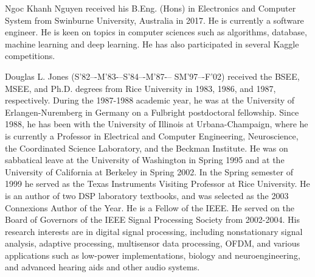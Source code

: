 \documentclass[journal]{IEEEtran}
\begin{document}
\begin{IEEEbiography}{Ngoc Khanh Nguyen} received his B.Eng. (Hons) in Electronics and Computer System from Swinburne University, Australia in 2017. He is currently a software engineer. He is keen on topics in computer sciences such as algorithms, database, machine learning and deep learning. He has also participated in several Kaggle competitions.
\end{IEEEbiography}


\begin{IEEEbiography}{Douglas L. Jones} (S’82–-M’83-–S’84–-M’87-–
SM’97–-F’02) received the BSEE, MSEE, and Ph.D. degrees from Rice University in 1983, 1986, and 1987, respectively. During the 1987-1988 academic year, he was at the University of Erlangen-Nuremberg in Germany on a Fulbright postdoctoral fellowship. Since 1988, he has been with the University of Illinois at Urbana-Champaign, where he is currently a Professor in Electrical and Computer Engineering, Neuroscience, the Coordinated Science Laboratory, and the Beckman Institute. He was on sabbatical leave at the University of Washington in Spring 1995 and at the University of California at Berkeley in Spring 2002. In the Spring semester of 1999 he served as the Texas Instruments Visiting Professor at Rice University. He is an author of two DSP laboratory textbooks, and was selected as the 2003 Connexions Author of the Year. He is a Fellow of the IEEE. He served on the Board of Governors of the IEEE Signal Processing Society from 2002-2004. His research interests are in digital signal processing, including nonstationary signal analysis, adaptive processing, multisensor data processing, OFDM, and various applications such as low-power implementations, biology and neuroengineering, and advanced hearing aids and other audio systems.  
\end{IEEEbiography}
\end{document}
